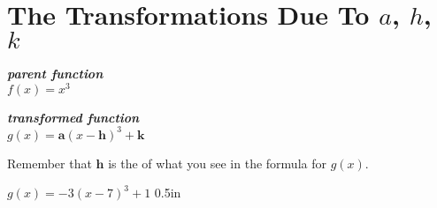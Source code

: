 \section{The Transformations Due To $a$, $h$, $k$}

\begin{tcbraster}[
    raster equal height,
    raster left skip = 1in, raster right skip = 1in, 
    raster column skip = 0.5in,
    raster before skip = 1\baselineskip, raster after skip = 1\baselineskip,
    ]
    \begin{tcolorbox}[]
        \centering
        {\bfseries\itshape parent function}\\[0.5\baselineskip]
        \large
        $f(x) = x^3$
    \end{tcolorbox}
    \begin{tcolorbox}[]
        \centering
        {\bfseries\itshape transformed function}\\[0.5\baselineskip]
        \large
        $g(x) = \bm{a} \left(x-\bm{h}\right)^3 + \bm{k}$
    \end{tcolorbox}
\end{tcbraster}

\begin{tcbraster}[]
\end{tcbraster}


\begin{myWarningBox}
    \begin{center}
        Remember that $\bm{h}$ is the  
        of what you see in the formula for $g(x)$.
    \end{center}
\end{myWarningBox}



{
    $g(x) = -3(x-7)^3 + 1$
}{0.5in}


